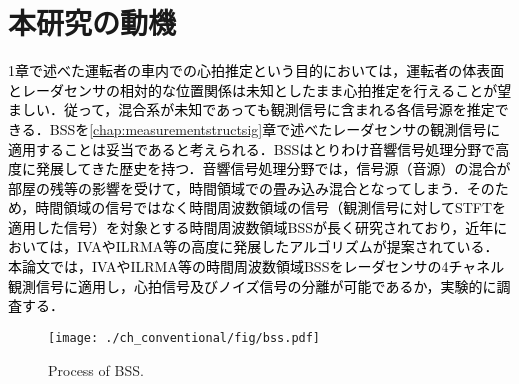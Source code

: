 \section{本研究の動機}
\label{sec:conv:researchmotivation}
\textcolor{black}{1章で述べた運転者の車内での心拍推定という目的においては，運転者の体表面とレーダセンサの相対的な位置関係は未知としたまま心拍推定を行えることが望ましい．従って，混合系が未知であっても観測信号に含まれる各信号源を推定できる．BSSを\ref{chap:measurementstructsig}章で述べたレーダセンサの観測信号に適用することは妥当であると考えられる．BSSはとりわけ音響信号処理分野で高度に発展してきた歴史を持つ．音響信号処理分野では，信号源（音源）の混合が部屋の残等の影響を受けて，時間領域での畳み込み混合となってしまう．そのため，時間領域の信号ではなく時間周波数領域の信号（観測信号に対してSTFTを適用した信号）を対象とする時間周波数領域BSSが長く研究されており，近年においては，IVAやILRMA等の高度に発展したアルゴリズムが提案されている．本論文では，IVAやILRMA等の時間周波数領域BSSをレーダセンサの4チャネル観測信号に適用し，心拍信号及びノイズ信号の分離が可能であるか，実験的に調査する．}

\begin{figure}[!t]
\centering
\texttt{[image: ./ch\_conventional/fig/bss.pdf]}
\caption{Process of BSS.}
\label{fig:bss}
\end{figure}


